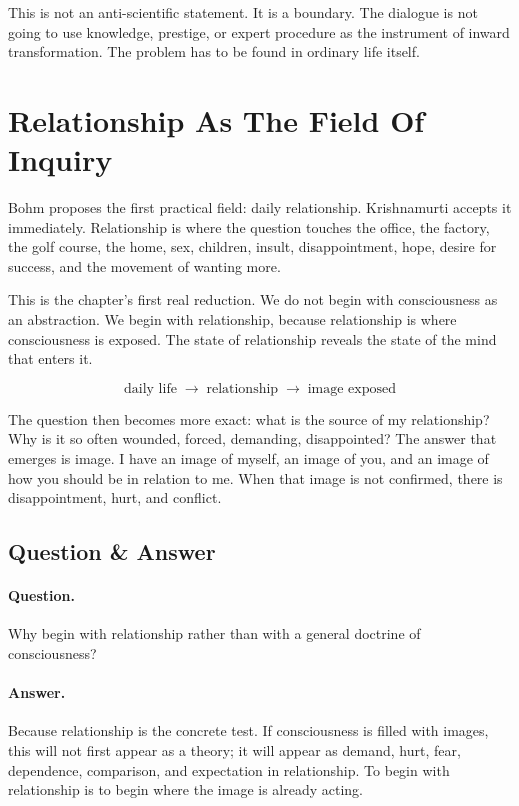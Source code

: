 This is not an anti-scientific statement. It is a boundary. The dialogue is not going to use knowledge, prestige, or expert procedure as the instrument of inward transformation. The problem has to be found in ordinary life itself.

\section{Relationship As The Field Of Inquiry}

Bohm proposes the first practical field: daily relationship. Krishnamurti accepts it immediately. Relationship is where the question touches the office, the factory, the golf course, the home, sex, children, insult, disappointment, hope, desire for success, and the movement of wanting more.

This is the chapter's first real reduction. We do not begin with consciousness as an abstraction. We begin with relationship, because relationship is where consciousness is exposed. The state of relationship reveals the state of the mind that enters it.

\begin{equation}
\text{daily life}
\;\longrightarrow\;
\text{relationship}
\;\longrightarrow\;
\text{image exposed}
\end{equation}

The question then becomes more exact: what is the source of my relationship? Why is it so often wounded, forced, demanding, disappointed? The answer that emerges is image. I have an image of myself, an image of you, and an image of how you should be in relation to me. When that image is not confirmed, there is disappointment, hurt, and conflict.

\subsection{Question \& Answer}

\paragraph{Question.}
Why begin with relationship rather than with a general doctrine of consciousness?

\paragraph{Answer.}
Because relationship is the concrete test. If consciousness is filled with images, this will not first appear as a theory; it will appear as demand, hurt, fear, dependence, comparison, and expectation in relationship. To begin with relationship is to begin where the image is already acting.

